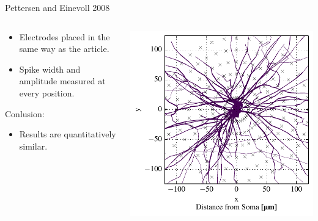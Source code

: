 \documentclass[aspectratio=169]{beamer}
\begin{document}
\begin{frame}{Pettersen and Einevoll 2008}
    \begin{columns}
        \begin{column}{0.48\textwidth}
            \begin{itemize}
                \item Electrodes placed in the same way as the article.
                \item Spike width and amplitude measured at every position.
            \end{itemize}
            Conlusion:
            \begin{itemize}
                \item Results are quantitatively similar. 
            \end{itemize}
        \end{column}
        \begin{column}{0.48\textwidth}
            \begin{center}
                \includegraphics[width=\textwidth]{images/disc_morph_elec_xz.pdf}
            \end{center}
        \end{column}
    \end{columns}
\end{frame}
\end{document}
